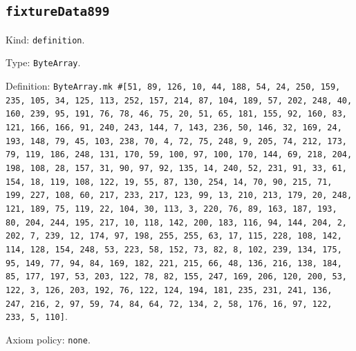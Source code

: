 \documentclass[11pt]{article}
\begin{document}
\subsection*{\texttt{fixtureData899}}
\noindent Kind: \texttt{definition}.\par
\noindent Type: \texttt{ByteArray}.\par
\noindent Definition: \texttt{ByteArray.mk \#[51, 89, 126, 10, 44, 188, 54, 24, 250, 159, 235, 105, 34, 125, 113, 252, 157, 214, 87, 104, 189, 57, 202, 248, 40, 160, 239, 95, 191, 76, 78, 46, 75, 20, 51, 65, 181, 155, 92, 160, 83, 121, 166, 166, 91, 240, 243, 144, 7, 143, 236, 50, 146, 32, 169, 24, 193, 148, 79, 45, 103, 238, 70, 4, 72, 75, 248, 9, 205, 74, 212, 173, 79, 119, 186, 248, 131, 170, 59, 100, 97, 100, 170, 144, 69, 218, 204, 198, 108, 28, 157, 31, 90, 97, 92, 135, 14, 240, 52, 231, 91, 33, 61, 154, 18, 119, 108, 122, 19, 55, 87, 130, 254, 14, 70, 90, 215, 71, 199, 227, 108, 60, 217, 233, 217, 123, 99, 13, 210, 213, 179, 20, 248, 121, 189, 75, 119, 22, 104, 30, 113, 3, 220, 76, 89, 163, 187, 193, 80, 204, 244, 195, 217, 10, 118, 142, 200, 183, 116, 94, 144, 204, 2, 202, 7, 239, 12, 174, 97, 198, 255, 255, 63, 17, 115, 228, 108, 142, 114, 128, 154, 248, 53, 223, 58, 152, 73, 82, 8, 102, 239, 134, 175, 95, 149, 77, 94, 84, 169, 182, 221, 215, 66, 48, 136, 216, 138, 184, 85, 177, 197, 53, 203, 122, 78, 82, 155, 247, 169, 206, 120, 200, 53, 122, 3, 126, 203, 192, 76, 122, 124, 194, 181, 235, 231, 241, 136, 247, 216, 2, 97, 59, 74, 84, 64, 72, 134, 2, 58, 176, 16, 97, 122, 233, 5, 110]}.\par
\noindent Axiom policy: \texttt{none}.\par
\end{document}
